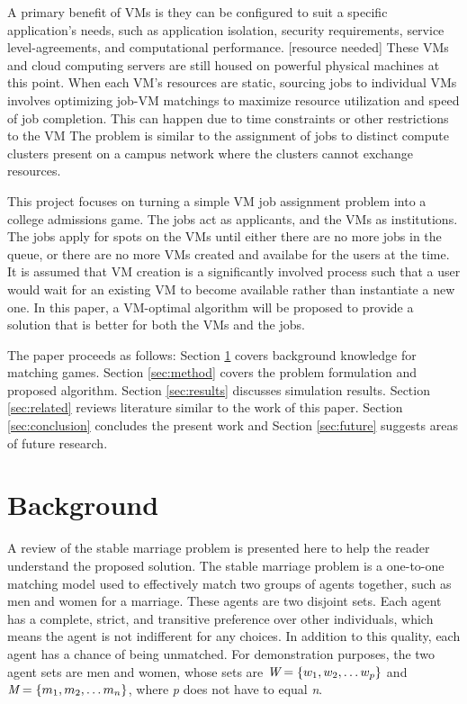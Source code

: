 \documentclass[conference]{IEEEtran}
\begin{document}
A primary benefit of VMs
is they can be configured to suit a specific application's
needs, such as application isolation, security requirements,
service level-agreements, and computational performance.  [resource needed]
These VMs and cloud computing servers
are still housed on powerful physical machines at this point.
When each VM's resources are static, 
sourcing jobs to individual VMs involves optimizing
job-VM matchings to maximize resource utilization and
speed of job completion.  This can happen due to time constraints or other restrictions to the VM
The problem is similar to the assignment of jobs to 
distinct compute clusters present on a campus network
where the clusters cannot exchange resources.

This project focuses on turning a simple VM job assignment
problem into a college admissions game.  The jobs act as applicants,
and the VMs as institutions.  The jobs apply for spots
on the VMs until either there are no more jobs in the 
queue, or there are no more VMs created and availabe for the
users at the time.  
It is assumed that VM creation is a significantly 
involved process such that a user would 
wait for an existing VM to become available
rather than instantiate a new one.
In this paper,
a VM-optimal algorithm will be proposed to provide a solution
that is better for both the VMs and the jobs.  

The paper proceeds as follows:  Section \ref{sec:background} covers 
background knowledge for matching games.  Section \ref{sec:method}
covers the problem formulation and proposed algorithm. Section
\ref{sec:results} discusses simulation results.  Section \ref{sec:related} 
reviews literature similar to the work of this paper.  
Section \ref{sec:conclusion} concludes the present work  
and Section \ref{sec:future} 
suggests areas of future research.

\section{Background}
\label{sec:background}
A review of the stable marriage problem is presented here 
to help the reader understand the proposed solution.
The stable marriage problem is a one-to-one matching
model used to effectively match two groups of agents
 together, such as men and women for a marriage.  
These agents are two disjoint sets.  Each agent
has a complete, strict, and  transitive preference over other
individuals, which means the agent is not indifferent for any choices.  
In addition to this quality, each agent has a chance
of being unmatched. For demonstration purposes,
the two agent sets are men and women, whose sets are 
\( \emph{W} = \{ {w_1}, {w_2}, \ldots {w_p} \} \) and
\( \emph{M} =\{ {m_1}, {m_2}, \ldots {m_n} \} \), 
where \emph{p} does not have to equal \emph{n}.
\end{document}
